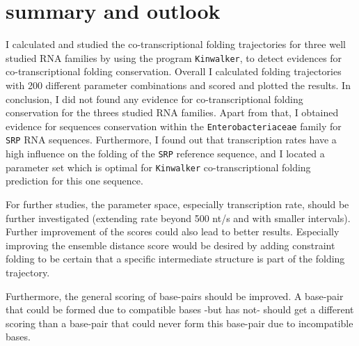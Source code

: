 \documentclass[ twoside,openright,titlepage,numbers=noenddot,headinclude,%
                footinclude=false, cleardoublepage=empty,abstractoff, %
                BCOR=5mm,paper=a4,fontsize=11pt,%
                ngerman,american,%
                ]{scrreprt}
\begin{document}

\section{summary and outlook}




I calculated and studied the co-transcriptional folding trajectories for three well studied RNA families by using the program \texttt{Kinwalker}, to detect evidences for co-transcriptional folding conservation. Overall I calculated folding trajectories with 200 different parameter combinations and scored and plotted the results. 
In conclusion, I did not found any evidence for co-transcriptional folding conservation for the threes studied RNA families. Apart from that, I obtained evidence for sequences conservation within the \texttt{Enterobacteriaceae} family for \texttt{SRP} RNA sequences.
Furthermore, I found out that transcription rates have a high influence on the folding of the \texttt{SRP} reference sequence, and I located a parameter set which is optimal for \texttt{Kinwalker} co-transcriptional folding prediction for this one sequence.


For further studies, the parameter space, especially transcription rate, should be further investigated (extending rate beyond 500 nt/s and with smaller intervals). 
Further improvement of the scores could also lead to better results. Especially improving the ensemble distance score would be desired by adding constraint folding to be certain that a specific intermediate structure is part of the folding trajectory.

Furthermore, the general scoring of base-pairs should be improved. A base-pair that could be formed due to compatible bases -but has not- should get a different scoring than a base-pair that could never form this base-pair due to incompatible bases.
  
\end{document}
